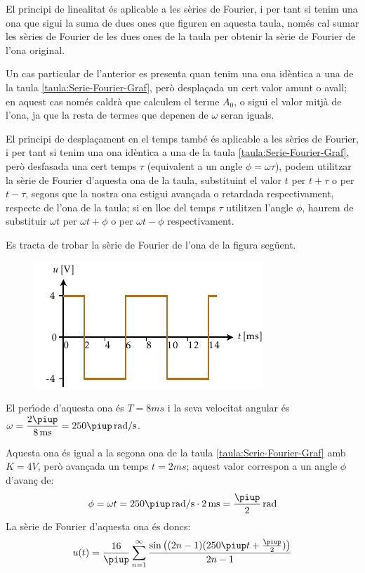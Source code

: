 El principi de linealitat \'{e}s aplicable a les s\`{e}ries de Fourier, i per tant si tenim una ona que sigui la suma de dues ones que figuren en aquesta taula, nom\'{e}s  cal sumar les s\`{e}ries de Fourier de les dues ones de la taula per obtenir la s\`{e}rie de Fourier de l'ona original.

Un cas particular de l'anterior es presenta quan tenim una ona  id\`{e}ntica a una de la taula \vref{taula:Serie-Fourier-Graf}, per\`{o} despla\c{c}ada un cert valor amunt o avall; en aquest cas nom\'{e}s caldr\`{a} que calculem el terme $A_0$, o sigui el valor mitj\`{a} de l'ona, ja que la resta de termes que depenen de $\omega$ seran iguals.

El principi de despla\c{c}ament en el temps tamb\'{e} \'{e}s aplicable a les s\`{e}ries de Fourier, i per tant si tenim una ona id\`{e}ntica a una de la taula \vref{taula:Serie-Fourier-Graf}, per\`{o} desfasada una cert temps $\tau$ (equivalent a un angle $\phi = \omega \tau$), podem utilitzar la s\`{e}rie de Fourier d'aquesta ona de la taula, substituint el valor $t$ per $t+\tau$ o per $t-\tau$, segons que la nostra ona estigui avan\c{c}ada o retardada respectivament, respecte de l'ona de la taula; si en lloc del temps $\tau$ utilitzen l'angle $\phi$, haurem de substituir  $\omega t$ per $\omega t + \phi$ o per $\omega t - \phi$ respectivament.


\begin{exemple}
Es tracta de trobar la s\`{e}rie de Fourier de l'ona de la figura seg\"{u}ent.
\begin{figure}[h]
\centering
    \includegraphics{Imatges/Cap-Fourier-Exemple-Taula.pdf}
\end{figure}

El per\'{\i}ode d'aquesta ona \'{e}s $T=8\unit{ms}$ i la seva velocitat angular \'{e}s $\omega = \dfrac{2\piup}{8\unit{ms}} = 250\piup\unit{rad/s}$.

Aquesta ona \'{e}s igual a la segona ona de la taula \vref{taula:Serie-Fourier-Graf} amb $K=4\unit{V}$, per\`{o} avan\c{c}ada un temps $t=2\unit{ms}$; aquest valor correspon a un angle $\phi$ d'avan\c{c} de:
\[
    \phi = \omega t = 250\piup\unit{rad/s} \cdot 2\unit{ms} = \frac{\piup}{2}\unit{rad}
\]
La s\`{e}rie de Fourier d'aquesta ona \'{e}s doncs:
\[
u(t) = \frac{{16}}{\piup }\sum\limits_{n = 1}^\infty  {\frac{{\sin \big((2n - 1)(250\piup t+ \frac{\piup}{2})\big)}}{{2n - 1}}}
\]
\end{exemple}

